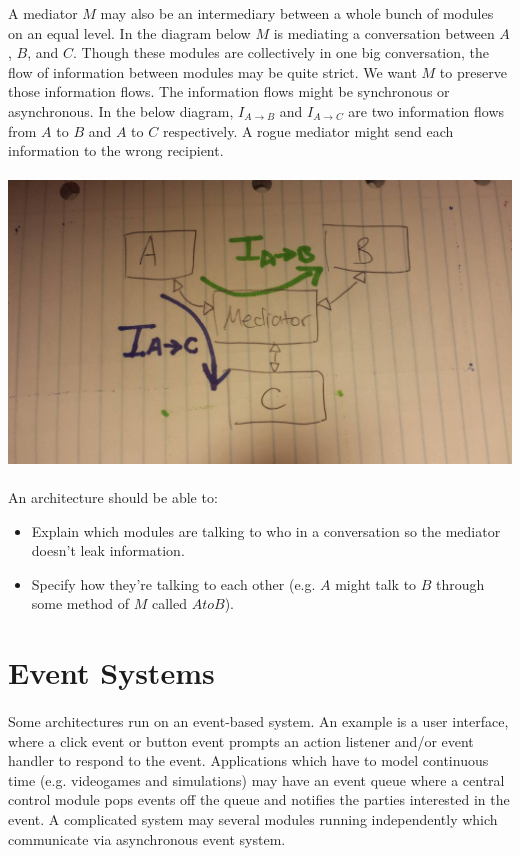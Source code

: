 \documentclass{article}
\begin{document}
A mediator $M$ may also be an intermediary between a whole bunch of modules on an equal level. In the diagram below $M$ is mediating a conversation between $A$, $B$, and $C$. Though these modules are collectively in one big conversation, the flow of information between modules may be quite strict. We want $M$ to preserve those information flows. The information flows might be synchronous or asynchronous. In the below diagram, $I_{A \rightarrow B}$ and $I_{A \rightarrow C}$ are two information flows from $A$ to $B$ and $A$ to $C$ respectively. A rogue mediator might send each information to the wrong recipient. 

\paragraph{}
\includegraphics[width=\textwidth]{conversation-mediator.jpeg}

\paragraph{}
An architecture should be able to:
\begin{itemize}
	\item Explain which modules are talking to who in a conversation so the mediator doesn't leak information.
	\item Specify how they're talking to each other (e.g. $A$ might talk to $B$ through some method of $M$ called $AtoB$).
\end{itemize}

\section{Event Systems}

\paragraph{}
Some architectures run on an event-based system. An example is a user interface, where a click event or button event prompts an action listener and/or event handler to respond to the event. Applications which have to model continuous time (e.g. videogames and simulations) may have an event queue where a central control module pops events off the queue and notifies the parties interested in the event. A complicated system may several modules running independently which communicate via asynchronous event system.
\end{document}
